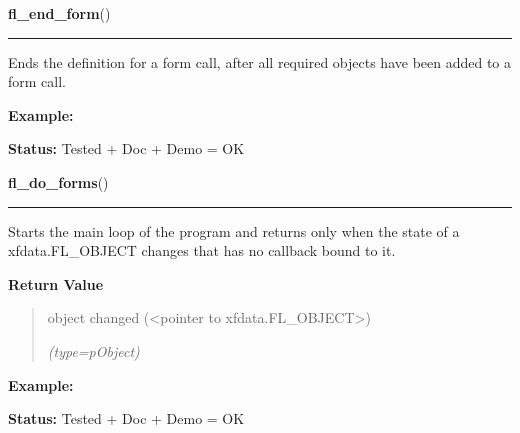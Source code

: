     \label{xformslib:library:fl_end_form}

    \vspace{0.5ex}

\hspace{.8\funcindent}\begin{boxedminipage}{\funcwidth}

    \raggedright \textbf{fl\_end\_form}()

    \vspace{-1.5ex}

    \rule{\textwidth}{0.5\fboxrule}
\setlength{\parskip}{2ex}
    Ends the definition for a form call, after all required objects have 
    been added to a form call.

\setlength{\parskip}{1ex}
\textbf{Example:} 

\textbf{Status:} Tested + Doc + Demo = OK



    \end{boxedminipage}

    \label{xformslib:library:fl_do_forms}

    \vspace{0.5ex}

\hspace{.8\funcindent}\begin{boxedminipage}{\funcwidth}

    \raggedright \textbf{fl\_do\_forms}()

    \vspace{-1.5ex}

    \rule{\textwidth}{0.5\fboxrule}
\setlength{\parskip}{2ex}
    Starts the main loop of the program and returns only when the state of 
    a xfdata.FL\_OBJECT changes that has no callback bound to it.

\setlength{\parskip}{1ex}
      \textbf{Return Value}
    \vspace{-1ex}

      \begin{quote}
      object changed ({\textless}pointer to 
      xfdata.FL\_OBJECT{\textgreater})

      {\it (type=pObject)}

      \end{quote}

\textbf{Example:} 

\textbf{Status:} Tested + Doc + Demo = OK



    \end{boxedminipage}

